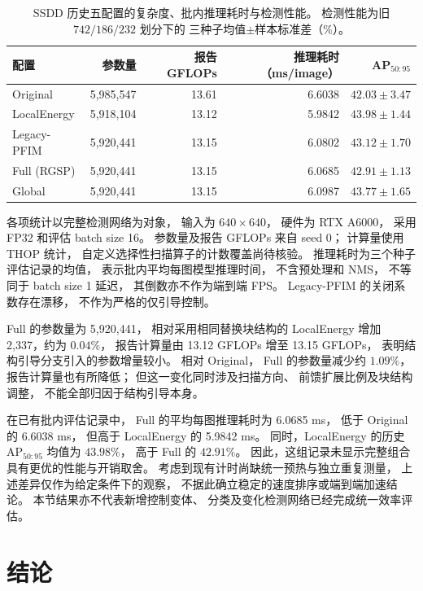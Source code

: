 \documentclass[journal]{IEEEtran}
\begin{document}
\begin{table}[!t]
\centering
\small
\setlength{\tabcolsep}{5pt}
\caption{SSDD 历史五配置的复杂度、批内推理耗时与检测性能。
检测性能为旧 $742/186/232$ 划分下的
三种子均值$\pm$样本标准差（\%）。}
\label{tab:rgsp_complexity_efficiency}
\begin{tabular*}{\textwidth}{@{\extracolsep{\fill}}lrrrr}
\toprule
配置 & 参数量 & 报告 GFLOPs
& 推理耗时（ms/image） & AP$_{50:95}$ \\
\midrule
Original
& 5,985,547 & 13.61 & 6.6038
& $42.03\pm3.47$ \\
LocalEnergy
& 5,918,104 & 13.12 & 5.9842
& $43.98\pm1.44$ \\
Legacy-PFIM
& 5,920,441 & 13.15 & 6.0802
& $43.12\pm1.70$ \\
Full (RGSP)
& 5,920,441 & 13.15 & 6.0685
& $42.91\pm1.13$ \\
Global
& 5,920,441 & 13.15 & 6.0987
& $43.77\pm1.65$ \\
\bottomrule
\end{tabular*}
\smallskip
\begin{minipage}{\linewidth}
\footnotesize
各项统计以完整检测网络为对象，
输入为 $640\times640$，
硬件为 RTX A6000，
采用 FP32 和评估 batch size 16。
参数量及报告 GFLOPs 来自 seed 0；
计算量使用 THOP 统计，
自定义选择性扫描算子的计数覆盖尚待核验。
推理耗时为三个种子评估记录的均值，
表示批内平均每图模型推理时间，
不含预处理和 NMS，
不等同于 batch size 1 延迟，
其倒数亦不作为端到端 FPS。
Legacy-PFIM 的关闭系数存在漂移，
不作为严格的仅引导控制。
\end{minipage}
\end{table}

Full 的参数量为 5,920,441，
相对采用相同替换块结构的 LocalEnergy
增加 2,337，约为 $0.04\%$，
报告计算量由 13.12 GFLOPs 增至 13.15 GFLOPs，
表明结构引导分支引入的参数增量较小。
相对 Original，
Full 的参数量减少约 $1.09\%$，
报告计算量也有所降低；
但这一变化同时涉及扫描方向、
前馈扩展比例及块结构调整，
不能全部归因于结构引导本身。

在已有批内评估记录中，
Full 的平均每图推理耗时为 6.0685 ms，
低于 Original 的 6.6038 ms，
但高于 LocalEnergy 的 5.9842 ms。
同时，LocalEnergy 的历史
$\mathrm{AP}_{50:95}$ 均值为 $43.98\%$，
高于 Full 的 $42.91\%$。
因此，这组记录未显示完整组合
具有更优的性能与开销取舍。
考虑到现有计时尚缺统一预热与独立重复测量，
上述差异仅作为给定条件下的观察，
不据此确立稳定的速度排序或端到端加速结论。
本节结果亦不代表新增控制变体、
分类及变化检测网络已经完成统一效率评估。

\FloatBarrier
\section{结论}
\label{sec:conclusion}
\end{document}
